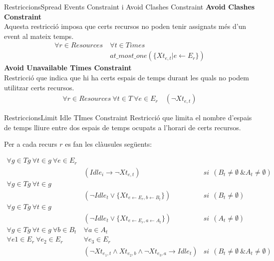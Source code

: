 \documentclass[11pt]{beamer}
\begin{document}
  \begin{frame}{Restriccions}{Spread Events Constraint i Avoid Clashes Constraint}   
      \textbf{Avoid Clashes Constraint}\\
      Aquesta restricció imposa que certs recursos no poden tenir assignats més d'un event al mateix temps. 
        \begin{align*}
          \forall r \in Resources \ & \forall t \in Times \\
          &at\_most\_one(\{Xt_{e,t} | e \leftarrow E_r\})
        \end{align*}
        \textbf{Avoid Unavailable Times Constraint}\\
        Restricció que indica que hi ha certs espais de temps durant les quals no podem utilitzar certs recursos.
        \begin{align*}
          \forall r \in Resources \ \forall t \in T \ \forall e \in E_r \quad
          (\neg Xt_{e,t})
        \end{align*}
    

  
  \end{frame}
  \begin{frame}{Restriccions}{Limit Idle TImes Constraint}
    Restricció que limita el nombre d'espais de temps lliure entre dos espais de temps ocupats a l'horari de certs recursos. 
    
    Per a cada recurs $r$ es fan les clàusules següents:

       \begin{align*}
        \forall g \in Tg \ \forall t \in g \ \forall e \in E_r& \\
        &(Idle_i \rightarrow \neg Xt_{e, t}) & si \ \ (B_t \neq \emptyset \ \& A_t \neq \emptyset) \\
        \forall g \in Tg \ \forall t \in g  \ & \\
        & (\neg Idle_t \lor \{Xt_{e\leftarrow E_r,b\leftarrow B_t}\}) & si \ \ (B_t \neq \emptyset)\\
        \forall g \in Tg \ \forall t \in g & \\
        & (\neg Idle_t \lor \{Xt_{e\leftarrow E_r,a\leftarrow A_t}\}) & si \ \ (A_t \neq \emptyset)\\
        \forall g \in Tg \ \forall t \in g \ \forall b \in B_t \ & \forall a \in A_t \\
        \forall e1 \in E_r \ \forall e_2 \in E_r \  &\forall e_3 \in E_r \\
        & (\neg Xt_{e_{1}, t} \land Xt_{e_2, b} \land \neg Xt_{e_3, a} \rightarrow Idle_t) & si \ \ (B_t \neq \emptyset \ \& A_t \neq \emptyset)
       \end{align*}
    
      \end{frame}
\end{document}
